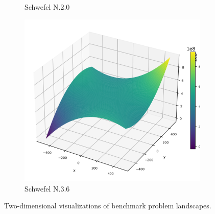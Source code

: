 \begin{figure}[p]
\begin{subfigure}{0.32\textwidth}
        \caption{Schwefel N.2.0}
    \end{subfigure}
    \begin{subfigure}{0.32\textwidth}
        \centering
        \includegraphics[width=1\textwidth]{Figures/benchmark_plots/Schwefel_N36_maximized.png}
        \caption{Schwefel N.3.6}
    \end{subfigure}
        \captionsetup{list=no}
\caption{Two-dimensional visualizations of benchmark problem landscapes.}
\end{figure}

